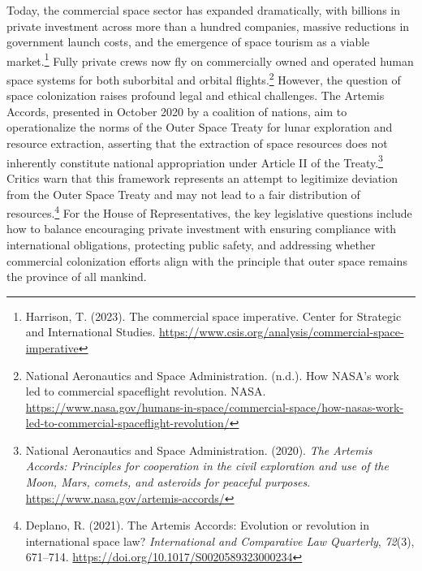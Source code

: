 Today, the commercial space sector has expanded dramatically, with billions in private investment across more than a hundred companies, massive reductions in government launch costs, and the emergence of space tourism as a viable market.\footnote{Harrison, T. (2023). The commercial space imperative. Center for Strategic and International Studies. \url{https://www.csis.org/analysis/commercial-space-imperative}} Fully private crews now fly on commercially owned and operated human space systems for both suborbital and orbital flights.\footnote{National Aeronautics and Space Administration. (n.d.). How NASA's work led to commercial spaceflight revolution. NASA. \url{https://www.nasa.gov/humans-in-space/commercial-space/how-nasas-work-led-to-commercial-spaceflight-revolution/}} However, the question of space colonization raises profound legal and ethical challenges. The Artemis Accords, presented in October 2020 by a coalition of nations, aim to operationalize the norms of the Outer Space Treaty for lunar exploration and resource extraction, asserting that the extraction of space resources does not inherently constitute national appropriation under Article II of the Treaty.\footnote{National Aeronautics and Space Administration. (2020). \emph{The Artemis Accords: Principles for cooperation in the civil exploration and use of the Moon, Mars, comets, and asteroids for peaceful purposes}. \url{https://www.nasa.gov/artemis-accords/}} Critics warn that this framework represents an attempt to legitimize deviation from the Outer Space Treaty and may not lead to a fair distribution of resources.\footnote{Deplano, R. (2021). The Artemis Accords: Evolution or revolution in international space law? \emph{International and Comparative Law Quarterly}, \emph{72}(3), 671–714. \url{https://doi.org/10.1017/S0020589323000234}} For the House of Representatives, the key legislative questions include how to balance encouraging private investment with ensuring compliance with international obligations, protecting public safety, and addressing whether commercial colonization efforts align with the principle that outer space remains the province of all mankind.
